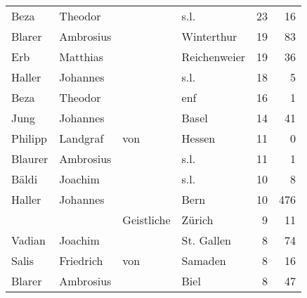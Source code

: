 \begin{tabular}{llllrr}
                     Beza &                            Theodor &             &                                        s.l. &         23 &        16 \\
                   Blarer &                          Ambrosius &             &                                  Winterthur &         19 &        83 \\
                      Erb &                           Matthias &             &                                Reichenweier &         19 &        36 \\
                   Haller &                           Johannes &             &                                        s.l. &         18 &         5 \\
                     Beza &                            Theodor &             &                                         enf &         16 &         1 \\
                     Jung &                           Johannes &             &                                       Basel &         14 &        41 \\
                  Philipp &                           Landgraf &         von &                                      Hessen &         11 &         0 \\
                  Blaurer &                          Ambrosius &             &                                        s.l. &         11 &         1 \\
                    Bäldi &                            Joachim &             &                                        s.l. &         10 &         8 \\
                   Haller &                           Johannes &             &                                        Bern &         10 &       476 \\
                          &                                    &  Geistliche &                                      Zürich &          9 &        11 \\
                   Vadian &                            Joachim &             &                                  St. Gallen &          8 &        74 \\
                    Salis &                          Friedrich &         von &                                     Samaden &          8 &        16 \\
                   Blarer &                          Ambrosius &             &                                        Biel &          8 &        47 \\

\end{tabular}
